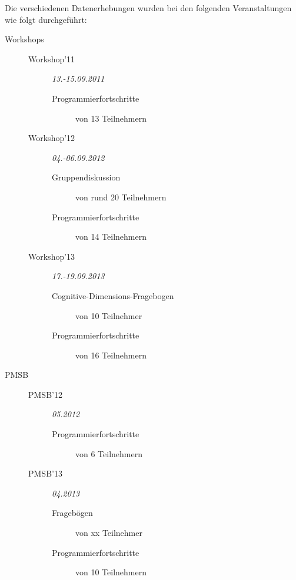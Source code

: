 Die verschiedenen Datenerhebungen wurden bei den folgenden Veranstaltungen wie folgt durchgeführt:
\begin{description}
  \item[Workshops] \hfill
  \begin{description}
    \item[Workshop'11] \textit{13.-15.09.2011}
    \begin{description}
      \item[Programmierfortschritte] von 13 Teilnehmern
    \end{description}
    
    \item[Workshop'12] \textit{04.-06.09.2012}
    \begin{description}
      \item[Gruppendiskussion] von rund 20 Teilnehmern
      \item[Programmierfortschritte] von 14 Teilnehmern
    \end{description}
     
    \item[Workshop'13] \textit{17.-19.09.2013}
    \begin{description}
      \item[Cognitive-Dimensions-Fragebogen] von 10 Teilnehmer
      \item[Programmierfortschritte] von 16 Teilnehmern
    \end{description}
  \end{description}
  
  \item[PMSB] \hfill
    \begin{description}
    \item[PMSB'12] \textit{05.2012}
    \begin{description}
      \item[Programmierfortschritte] von 6 Teilnehmern
    \end{description}
    
    \item[PMSB'13] \textit{04.2013}
    \begin{description}
      \item[Fragebögen] von xx Teilnehmer
      \item[Programmierfortschritte] von 10 Teilnehmern
    \end{description}
    

\end{description}
\end{description}
